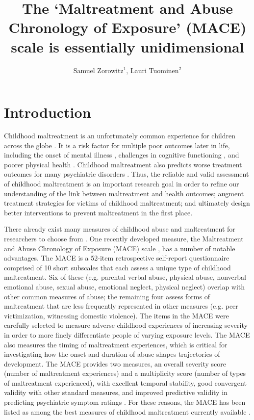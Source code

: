 \documentclass[letterpaper,man,natbib]{apa6}  %
\title{The `Maltreatment and Abuse Chronology of Exposure' (MACE) scale is essentially unidimensional}
\author{Samuel Zorowitz$^1$, Lauri Tuominen$^{2}$}
\affiliation{$^1$Princeton Neuroscience Institute, Princeton University, USA\\$^2$The Royal’s Institute of Mental Health Research, University of Ottawa, Canada}
\begin{document}
\maketitle

\section{Introduction}

Childhood maltreatment is an unfortunately common experience for children across the globe \citep{stoltenborgh2015prevalence}. It is a risk factor for multiple poor outcomes later in life, including the onset of mental illness \citep{macmillan2001childhood, green2010childhood, kessler2010childhood}, challenges in cognitive functioning \citep{kavanaugh2017neurocognitive, r2018common, su2019does}, and poorer physical health \citep{wegman2009meta, widom2012prospective, goodwin2004association}. Childhood maltreatment also predicts worse treatment outcomes for many psychiatric disorders \citep{nanni2012childhood, thomas2019childhood, schuckher2019history}. Thus, the reliable and valid assessment of childhood maltreatment is an important research goal in order to refine our understanding of the link between maltreatment and health outcomes; augment treatment strategies for victims of childhood maltreatment; and ultimately design better interventions to prevent maltreatment in the first place. 

There already exist many measures of childhood abuse and maltreatment for researchers to choose from \citep{saini2019systematic}. One recently developed measure, the Maltreatment and Abuse Chronology of Exposure (MACE) scale \citep{teicher2015maltreatment}, has a number of notable advantages. The MACE is a 52-item retrospective self-report questionnaire comprised of 10 short subscales that each assess a unique type of childhood maltreatment. Six of these (e.g. parental verbal abuse, physical abuse, nonverbal emotional abuse, sexual abuse, emotional neglect, physical neglect) overlap with other common measures of abuse; the remaining four assess forms of maltreatment that are less frequently represented in other measures (e.g. peer victimization, witnessing domestic violence). The items in the MACE were carefully selected to measure adverse childhood experiences of increasing severity in order to more finely differentiate people of varying exposure levels. The MACE also measures the timing of maltreatment experiences, which is critical for investigating how the onset and duration of abuse shapes trajectories of development. The MACE provides two measures, an overall severity score (number of maltreatment experiences) and a multiplicity score (number of types of maltreatment experienced), with excellent temporal stability, good convergent validity with other standard measures, and improved predictive validity in predicting psychiatric symptom ratings \citep{teicher2015maltreatment}. For these reasons, the MACE has been listed as among the best measures of childhood maltreatment currently available \citep{saini2019systematic, georgieva2022systematic}.
\end{document}
